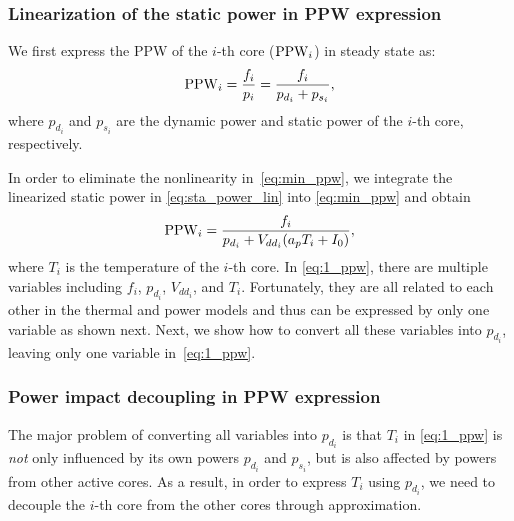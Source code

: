 

\subsubsection{Linearization of the static power in PPW expression}\label{sec:opt_temp_iso}

We first express the PPW of the $i$-th core ($\operatorname{PPW}_i$) in steady state as:
\begin{equation}\label{eq:min_ppw}
\ppw_i=\frac{f_i}{p_i}=\frac{f_i}{p_{d_i}+p_{s_i}},
\end{equation}
where $p_{d_i}$ and $p_{s_i}$ are the dynamic power and static power
of the $i$-th core, respectively. 

In order to eliminate the nonlinearity in~\eqref{eq:min_ppw}, we
integrate the linearized static power in \eqref{eq:sta_power_lin} into
\eqref{eq:min_ppw} and obtain
\begin{equation}\label{eq:1_ppw}
\ppw_i = \frac{f_i}{p_{d_i}+V_{dd_i}(a_pT_i+I_{0})},
\end{equation}
where $T_i$ is the temperature of the $i$-th core. In \eqref{eq:1_ppw}, there are multiple variables
including $f_i$, $p_{d_i}$, $V_{dd_i}$, and $T_i$. Fortunately, they are all
related to each other in the thermal and power models and thus can be expressed by only one
variable as shown next. Next, we show how to convert all these variables into
$p_{d_i}$, leaving only one variable in~\eqref{eq:1_ppw}.

\subsubsection{Power impact decoupling in PPW expression}
The major problem of converting all variables into $p_{d_i}$ is that
$T_{i}$ in \eqref{eq:1_ppw} is \emph{not} only influenced by its own
powers $p_{d_i}$ and $p_{s_i}$, but is also affected by powers from
other active cores. As a result, in order to express $T_{i}$ using $p_{d_i}$, we need to
decouple the $i$-th core from the other cores through approximation. 

